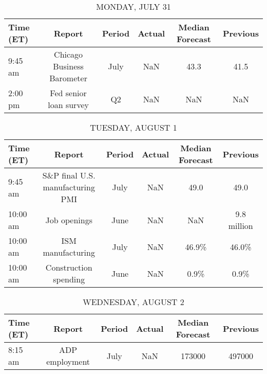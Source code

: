 \documentclass{article}%
\begin{document}
%
\normalsize%


\begin{table}[htbp]%
\caption{MONDAY, JULY 31}%
\centering%
\begin{adjustbox}{width=1\textwidth}%
\begin{tabular}{lccccc}
\toprule
Time (ET) &                     Report & Period & Actual & Median Forecast & Previous \\
\midrule
  9:45 am & Chicago Business Barometer &   July &    NaN &            43.3 &     41.5 \\
  2:00 pm &     Fed senior loan survey &     Q2 &    NaN &             NaN &      NaN \\
\bottomrule
\end{tabular}
%
\end{adjustbox}%
\end{table}

%


\begin{table}[htbp]%
\caption{TUESDAY, AUGUST 1}%
\centering%
\begin{adjustbox}{width=1\textwidth}%
\begin{tabular}{lccccc}
\toprule
Time (ET) &                           Report & Period & Actual & Median Forecast &    Previous \\
\midrule
  9:45 am & S\&P final U.S. manufacturing PMI &   July &    NaN &            49.0 &        49.0 \\
 10:00 am &                     Job openings &   June &    NaN &             NaN & 9.8 million \\
 10:00 am &                ISM manufacturing &   July &    NaN &           46.9\% &       46.0\% \\
 10:00 am &            Construction spending &   June &    NaN &            0.9\% &        0.9\% \\
\bottomrule
\end{tabular}
%
\end{adjustbox}%
\end{table}

%


\begin{table}[htbp]%
\caption{WEDNESDAY, AUGUST 2}%
\centering%
\begin{adjustbox}{width=1\textwidth}%
\begin{tabular}{lccccc}
\toprule
Time (ET) &         Report & Period & Actual & Median Forecast & Previous \\
\midrule
  8:15 am & ADP employment &   July &    NaN &          173000 &   497000 \\
\bottomrule
\end{tabular}
%
\end{adjustbox}%
\end{table}
\end{document}
